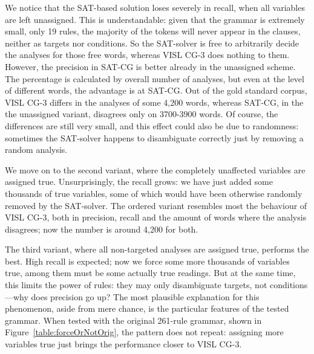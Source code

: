 We notice that the SAT-based solution loses severely in recall, 
when all variables are left unassigned. This is understandable: given that
the grammar is extremely small, only 19 rules, the majority of the tokens will 
never appear in the clauses, neither as targets nor conditions. So the SAT-solver is free to 
arbitrarily decide the analyses for those free words, whereas VISL CG-3 does nothing to them.
However, the precision in SAT-CG is better already in the unassigned scheme.
The percentage is calculated by overall number of analyses, but even at the level of different words, the advantage is at SAT-CG. Out of the gold standard corpus, VISL CG-3 differs in the analyses of some 4,200 words, whereas SAT-CG, in the the unassigned variant, disagrees only on 3700-3900 words. 
Of course, the differences are still very small, and this effect could also be due to randomness: sometimes the SAT-solver happens to disambiguate correctly just by removing a random analysis.

We move on to the second variant, where the completely unaffected variables are assigned true. 
Unsurprisingly, the recall grows: we have just added some thousands of true variables, 
some of which would have been otherwise randomly removed by the SAT-solver. 
The ordered variant resembles most the behaviour of VISL CG-3, both in precision, recall and the amount of words where the analysis disagrees; now the number is around 4,200 for both.

The third variant, where all non-targeted analyses are assigned true, performs the best. 
High recall is expected; now we force some more thousands of variables true, 
among them must be some actually true readings.
But at the same time, this limits the power of rules: they may only disambiguate targets, not conditions---why does precision go up?
The most plausible explanation for this phenomenon, aside from mere chance, 
is the particular features of the tested grammar. 
When tested with the original 261-rule grammar, 
shown in Figure~\ref{table:forceOrNotOrig}, the pattern does not repeat: 
assigning more variables true just brings the performance closer to VISL CG-3.

